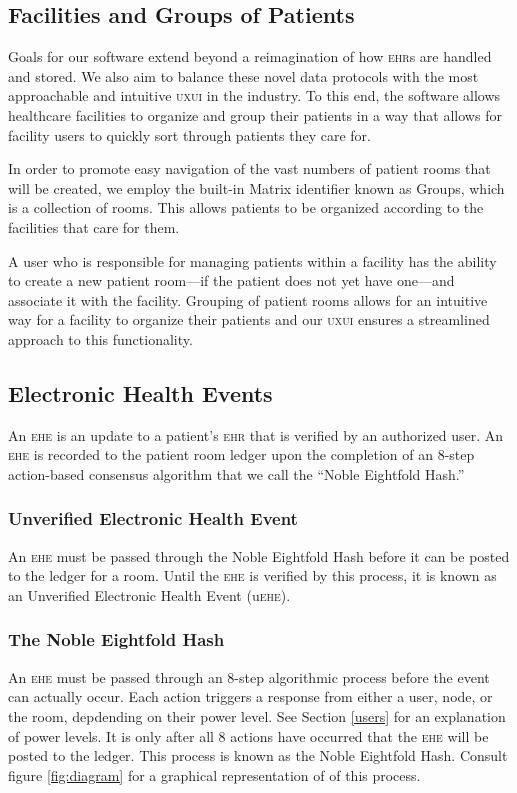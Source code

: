 \subsection{Facilities and Groups of Patients}
Goals for our software extend beyond a reimagination of how \textsc{ehr}s are handled and stored. We also aim to balance these novel data protocols with the most approachable and intuitive \textsc{uxui} in the industry. To this end, the software allows healthcare facilities to organize and group their patients in a way that allows for facility users to quickly sort through patients they care for.%

In order to promote easy navigation of the vast numbers of patient rooms that will be created, we employ the built-in Matrix identifier known as Groups, which is a collection of rooms. This allows patients to be organized according to the facilities that care for them.%

A user who is responsible for managing patients within a facility has the ability to create a new patient room---if the patient does not yet have one---and associate it with the facility. Grouping of patient rooms allows for an intuitive way for a facility to organize their patients and our \textsc{uxui} ensures a streamlined approach to this functionality.%

\subsection{Electronic Health Events}
An \textsc{ehe} is an update to a patient's \textsc{ehr} that is verified by an authorized user. An \textsc{ehe} is recorded to the patient room ledger upon the completion of an 8-step action-based consensus algorithm that we call the ``Noble Eightfold Hash.''%

  \subsubsection{Unverified Electronic Health Event}
  An \textsc{ehe} must be passed through the Noble Eightfold Hash before it can be posted to the ledger for a room. Until the \textsc{ehe} is verified by this process, it is known as an Unverified Electronic Health Event (u\textsc{ehe}).%

  \subsubsection{The Noble Eightfold Hash}
  An \textsc{ehe} must be passed through an 8-step algorithmic process before the event can actually occur. Each action triggers a response from either a user, node, or the room, depdending on their power level. See Section \ref{users} for an explanation of power levels. It is only after all 8 actions have occurred that the \textsc{ehe} will be posted to the ledger. This process is known as the Noble Eightfold Hash. Consult figure \ref{fig:diagram} for a graphical representation of of this process.%

